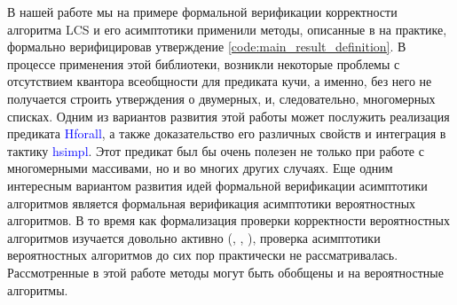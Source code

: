 В нашей работе мы на примере формальной верификации корректности алгоритма LCS и его асимптотики применили методы, описанные в \cite{base_article}
на практике, формально верифицировав утверждение \ref{code:main_result_definition}.
В процессе применения этой библиотеки, возникли некоторые проблемы с отсутствием квантора всеобщности для предиката кучи,
а именно, без него не получается строить утверждения о двумерных, и, следовательно, многомерных списках. Одним из вариантов развития
этой работы может послужить реализация предиката \textcolor{blue}{Hforall}, а также доказательство его различных свойств и интеграция в тактику
\textcolor{blue}{hsimpl}. Этот предикат был бы очень полезен не только при работе с многомерными массивами, но и во многих других случаях.
Еще одним интересным вариантом развития идей формальной верификации асимптотики алгоритмов является формальная верификация асимптотики
вероятностных алгоритмов. В то время как формализация проверки корректности вероятностных алгоритмов изучается довольно активно
(\cite{AUDEBAUD2009568}, \cite{tassarotti2017verifying}, \cite{10.1007/978-3-319-46750-4_5}), проверка асимптотики вероятностных алгоритмов
до сих пор практически не рассматривалась. Рассмотренные в этой работе методы могут быть обобщены и на вероятностные алгоритмы.
